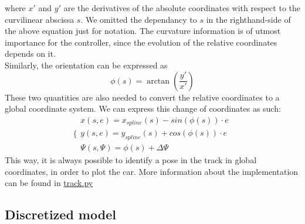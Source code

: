 \documentclass[a4paper, onecolumn, 12pt]{article}
\begin{document}
where $x'$ and $y'$ are the derivatives of the absolute coordinates with respect
to the curvilinear abscissa $s$. We omitted the dependancy to $s$ in the
righthand-side of the above equation just for notation. The curvature
information is of utmost importance for the controller, since the evolution of
the relative coordinates depends on it. \\
Similarly, the orientation can be expressed as
\begin{equation}
    \phi(s) = \arctan\left(\frac{y'}{x'}\right)
\end{equation}
These two quantities are also needed to convert the relative coordinates to a
global coordinate system. We can express this change of coordinates as such:
\begin{equation}
    \Bigg\{
        \begin{array}{ll}
            x(s,e) =  x_{spline}(s) - sin(\phi(s)) \cdot e\\
            y(s,e) =  y_{spline}(s) + cos(\phi(s)) \cdot e\\
            \varPsi(s,\varPsi) = \phi(s) + \Delta \varPsi
        \end{array}
\end{equation}
This way, it is always possible to identify a pose in the track in global
coordinates, in order to plot the car. More information about the implementation
can be found in
\href{https://github.com/neverorfrog/vehicle-control/blob/main/environment/track.py}{track.py}


\subsection{Discretized model}
\end{document}

